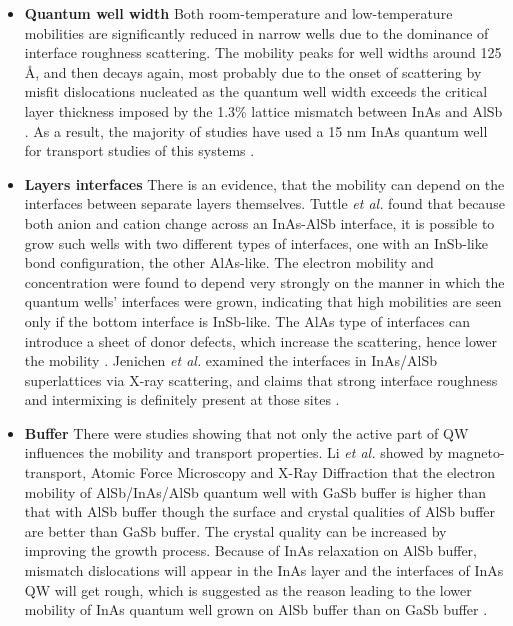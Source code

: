\documentclass[titlepage,a4paper]{book}
\newcommand{\wciecie}{\quad\phantom{v}}
\begin{document}
\begin{itemize}
\item \textbf{Quantum well width} \newline  
\wciecie
Both room-temperature and low-temperature mobilities are significantly reduced in narrow wells due to the dominance of interface roughness scattering. The mobility peaks for well widths around 125 Å, and then decays again, most probably due to the onset of scattering by misfit dislocations nucleated as the quantum well width exceeds the critical layer thickness imposed by the 1.3\% lattice mismatch between InAs and AlSb \cite{Bolognesi_Width}. As a result, the majority of studies have used a 15 nm InAs quantum well for transport studies of this systems \cite{Li_InAs}.

\item \textbf{Layers interfaces} \newline
\wciecie
There is an evidence, that the mobility can depend on the interfaces between separate layers themselves. Tuttle \textit{et al.} \cite{Tuttle_Interface} found that because both anion and cation change across an InAs-AlSb interface, it is possible to grow such wells with two different types of interfaces, one with an InSb-like bond configuration, the other AlAs-like. The electron mobility and concentration were found to depend very strongly on the manner in which the quantum wells' interfaces were grown, indicating that high mobilities are seen only if the bottom interface is InSb-like. The AlAs type of interfaces can introduce a sheet of donor defects, which increase the scattering, hence lower the mobility \cite{Tuttle_Interface}. Jenichen \textit{et al.} examined the interfaces in InAs/AlSb superlattices via X-ray scattering, and claims that strong interface roughness and intermixing is definitely present at those sites \cite{Jenichen_Interfaces}.

\item \textbf{Buffer} \newline
\wciecie
There were studies showing that not only the active part of QW influences the mobility and transport properties. Li \textit{et al.} \cite{Li_InAs} showed by magneto-transport, Atomic Force Microscopy and X-Ray Diffraction that the electron mobility of AlSb/InAs/AlSb quantum well with GaSb buffer is higher than that with AlSb buffer though the surface and crystal qualities of AlSb buffer are better than GaSb buffer. The crystal quality can be increased by improving the growth process. Because of InAs relaxation on AlSb buffer, mismatch dislocations will appear in the InAs layer and the interfaces of InAs QW will get rough, which is suggested as the reason leading to the lower mobility of InAs quantum well grown on AlSb buffer than on GaSb buffer \cite{Li_InAs}. 


\end{itemize}
\end{document}
